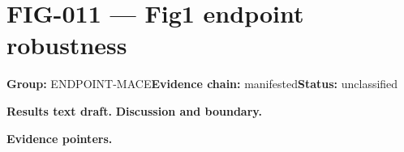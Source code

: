 \clearpage
\section{FIG-011 --- Fig1 endpoint robustness}
\label{figpage:fig-011}
\textbf{Group:} ENDPOINT-MACE\quad \textbf{Evidence chain:} manifested\quad \textbf{Status:} unclassified

\textbf{Results text draft.} 
\textbf{Discussion and boundary.} 


\textbf{Evidence pointers.}



\vfill
